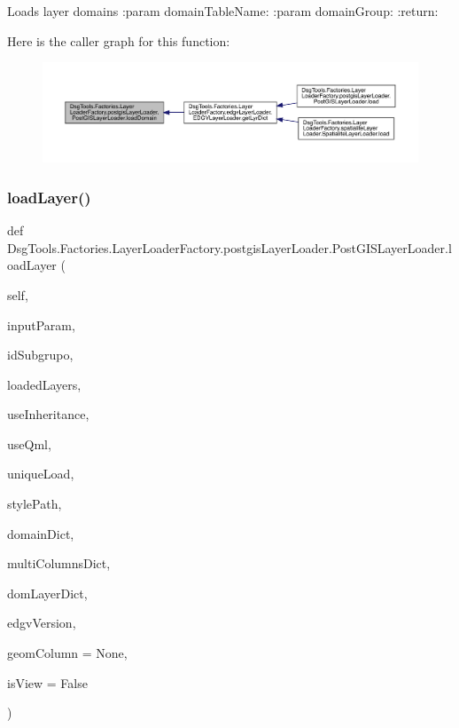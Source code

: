 \begin{DoxyVerb}Loads layer domains
:param domainTableName:
:param domainGroup:
:return:
\end{DoxyVerb}
 Here is the caller graph for this function\+:
\nopagebreak
\begin{figure}[H]
\begin{center}
\leavevmode
\includegraphics[width=350pt]{class_dsg_tools_1_1_factories_1_1_layer_loader_factory_1_1postgis_layer_loader_1_1_post_g_i_s_layer_loader_a337ead19d37879c82f062817fa2110ee_icgraph}
\end{center}
\end{figure}
\mbox{\label{class_dsg_tools_1_1_factories_1_1_layer_loader_factory_1_1postgis_layer_loader_1_1_post_g_i_s_layer_loader_a5203595a972a1a53441b5f6692b3c028}} 
\subsubsection{\texorpdfstring{load\+Layer()}{loadLayer()}}
{\footnotesize\ttfamily def Dsg\+Tools.\+Factories.\+Layer\+Loader\+Factory.\+postgis\+Layer\+Loader.\+Post\+G\+I\+S\+Layer\+Loader.\+load\+Layer (\begin{DoxyParamCaption}\item[{}]{self,  }\item[{}]{input\+Param,  }\item[{}]{id\+Subgrupo,  }\item[{}]{loaded\+Layers,  }\item[{}]{use\+Inheritance,  }\item[{}]{use\+Qml,  }\item[{}]{unique\+Load,  }\item[{}]{style\+Path,  }\item[{}]{domain\+Dict,  }\item[{}]{multi\+Columns\+Dict,  }\item[{}]{dom\+Layer\+Dict,  }\item[{}]{edgv\+Version,  }\item[{}]{geom\+Column = {\ttfamily None},  }\item[{}]{is\+View = {\ttfamily False} }\end{DoxyParamCaption})}


